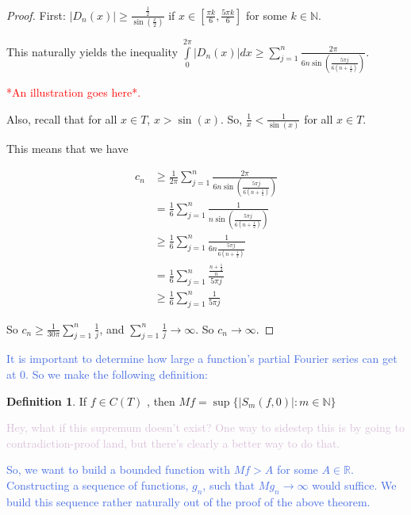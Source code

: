 \documentclass{amsart}
\newcommand{\N}{\mathbb{N}}
\newcommand{\R}{\mathbb{R}}
\newcommand{\colorcomment}[2]{\textcolor{#1}{#2}} %
\newcommand{\absval}[1]{\lvert #1 \rvert}
\theoremstyle{definition}
\newtheorem{definition}[thm]{Definition}
\begin{document}
\begin{proof}

First: $\absval{D_n(x)} \geq \frac{\frac{1}{2}}{\sin(\frac{x}{2})}$ if $x \in [\frac{\pi k}{6},\frac{5 \pi k}{6}]$ for some $k \in \N$.

This naturally yields the inequality $\int\limits_0^{2\pi} \absval{D_n(x)} dx \geq \sum\limits_{j=1}^n \frac{2 \pi}{6n \sin(\frac{5\pi j}{6(n+\frac{1}{2})})}$. 

\colorcomment{red}{*An illustration goes here*.}

Also, recall that for all $x \in T$, $x > \sin(x)$. 
So, $\frac{1}{x} < \frac{1}{\sin(x)}$ for all $x \in T$.

This means that we have

\begin{align*}
c_n &\geq \frac{1}{2 \pi} \sum\limits_{j=1}^n \frac{2 \pi}{6n \sin(\frac{5\pi j}{6(n+\frac{1}{2})})}\\
&= \frac{1}{6} \sum\limits_{j=1}^n \frac{1}{n \sin(\frac{5\pi j}{6(n+\frac{1}{2})})}\\
&\geq \frac{1}{6} \sum\limits_{j=1}^n \frac{1}{6n \frac{5\pi j}{6(n+\frac{1}{2})}}\\
&= \frac{1}{6} \sum\limits_{j=1}^n \frac{\frac{n+\frac{1}{2}}{n}}{5\pi j}\\
&\geq \frac{1}{6} \sum\limits_{j=1}^n \frac{1}{5\pi j}
\end{align*}

So $c_n \geq \frac{1}{30 \pi} \sum\limits_{j=1}^n \frac{1}{ j}$, and $\sum\limits_{j=1}^n \frac{1}{j} \to \infty$. So $c_n \to \infty$.

\end{proof}

\colorcomment{RoyalBlue}{It is important to determine how large a function's partial Fourier series can get at $0$. 
So we make the following definition:}

\begin{definition}
If $f \in C(T)$ , then $Mf = \sup\{\absval{S_m(f,0)} : m \in \N\}$ 
\end{definition}

\colorcomment{Thistle}{Hey, what if this supremum doesn't exist? One way to sidestep this is by going to contradiction-proof land, but there's clearly a better way to do that.}

\colorcomment{RoyalBlue}{So, we want to build a bounded function with $Mf >A$ for some $A \in \R$.
Constructing a sequence of functions, $g_n$, such that $Mg_n \to \infty$ would suffice.
We build this sequence rather naturally out of the proof of the above theorem.}
\end{document}
